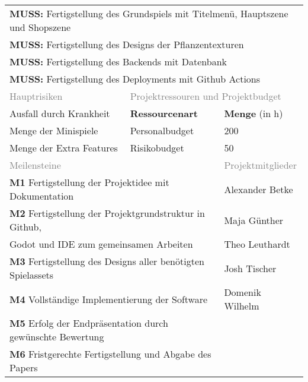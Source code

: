 \begin{table}[H]
\begin{tabular}{|l|l|l|}
        \multicolumn{3}{|l|}{\textbf{MUSS:} Fertigstellung des Grundspiels mit Titelmenü, Hauptszene und Shopszene}\\
        \multicolumn{3}{|l|}{\textbf{MUSS:} Fertigstellung des Designs der Pflanzentexturen}\\
        \multicolumn{3}{|l|}{\textbf{MUSS:} Fertigstellung des Backends mit Datenbank}\\
        \multicolumn{3}{|l|}{\textbf{MUSS:} Fertigstellung des Deployments mit Github Actions}\\
        \hline
        \footnotesize{\textcolor{gray}{Hauptrisiken}} & \multicolumn{2}{|l|}{\footnotesize{\textcolor{gray}{Projektressouren und Projektbudget}}}\\
        Ausfall durch Krankheit & \textbf{Ressourcenart} & \textbf{Menge} (in h) \\
        Menge der Minispiele & Personalbudget & 200\\
        Menge der Extra Features & Risikobudget & 50\\
        \hline
        \multicolumn{2}{|l|}{\footnotesize{\textcolor{gray}{Meilensteine}}} & \footnotesize{\textcolor{gray}{Projektmitglieder}}\\
        \multicolumn{2}{|l|}{\textbf{M1} Fertigstellung der Projektidee mit Dokumentation} & Alexander Betke\\
        \multicolumn{2}{|l|}{\textbf{M2} Fertigstellung der Projektgrundstruktur in Github,} & Maja Günther\\
        \multicolumn{2}{|l|}{Godot und IDE zum gemeinsamen Arbeiten} & Theo Leuthardt\\
        \multicolumn{2}{|l|}{\textbf{M3} Fertigstellung des Designs aller benötigten Spielassets} & Josh Tischer\\
        \multicolumn{2}{|l|}{\textbf{M4} Vollständige Implementierung der Software} & Domenik Wilhelm\\
        \multicolumn{2}{|l|}{\textbf{M5} Erfolg der Endpräsentation durch gewünschte Bewertung} & \\
        \multicolumn{2}{|l|}{\textbf{M6} Fristgerechte Fertigstellung und Abgabe des Papers} & \\
        \hline
    \end{tabular}
\end{table}